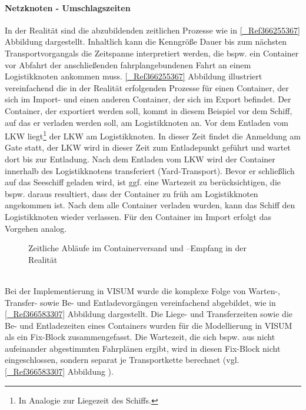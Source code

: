 % 
\paragraph{Netzknoten - Umschlagszeiten}
In der Realität sind die abzubildenden zeitlichen Prozesse wie in \autoref{_Ref366255367} Abbildung  dargestellt. Inhaltlich kann die Kenngröße \glqq Dauer bis zum nächsten Transportvorgang\grqq  als die Zeitspanne interpretiert werden, die bspw. ein Container vor Abfahrt der anschließenden fahrplangebundenen Fahrt an einem Logistikknoten ankommen muss. \autoref{_Ref366255367} Abbildung  illustriert vereinfachend die in der Realität erfolgenden Prozesse für einen Container, der sich im Import- und einen anderen Container, der sich im Export befindet. Der Container, der exportiert werden soll, kommt in diesem Beispiel vor dem Schiff, auf das er verladen werden soll, am Logistikknoten an. Vor dem Entladen vom LKW \glqq liegt\grqq \footnote{%
 In Analogie zur Liegezeit des Schiffs.
}%
 der LKW am Logistikknoten. In dieser Zeit findet die Anmeldung am Gate statt, der LKW wird in dieser Zeit zum Entladepunkt geführt und wartet dort bis zur Entladung. Nach dem Entladen vom LKW wird der Container innerhalb des Logistikknotens transferiert (Yard-Transport). Bevor er schließlich auf das Seeschiff geladen wird, ist ggf. eine Wartezeit zu berücksichtigen, die bspw. daraus resultiert, dass der Container zu früh am Logistikknoten angekommen ist. Nach dem alle Container verladen wurden, kann das Schiff den Logistikknoten wieder verlassen. Für den Container im Import erfolgt das Vorgehen analog.~\\

\begin{figure}[htbp]
  \centering
  \caption{ Zeitliche Abläufe im Containerversand und –Empfang in der Realität}
  \label{_Ref366255367}
\end{figure}
~\\
Bei der Implementierung in VISUM wurde die komplexe Folge von Warten-, Transfer- sowie Be- und Entladevorgängen vereinfachend abgebildet, wie in \autoref{_Ref366583307} Abbildung  dargestellt. Die Liege- und Transferzeiten sowie die Be- und Entladezeiten eines Containers wurden für die Modellierung in VISUM als ein Fix-Block zusammengefasst. Die Wartezeit, die sich bspw. aus nicht aufeinander abgestimmten Fahrplänen ergibt, wird in diesen Fix-Block nicht eingeschlossen, sondern separat je Transportkette berechnet (vgl. \autoref{_Ref366583307} Abbildung ). ~\\

